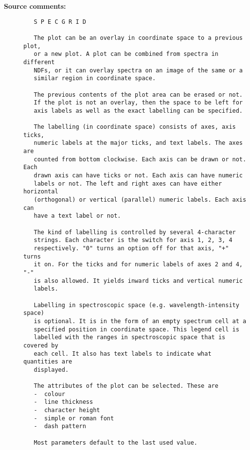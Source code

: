 \begin{description}
\item [{\bf Source comments:}]
\begin{verbatim}
   S P E C G R I D

   The plot can be an overlay in coordinate space to a previous plot,
   or a new plot. A plot can be combined from spectra in different
   NDFs, or it can overlay spectra on an image of the same or a
   similar region in coordinate space.

   The previous contents of the plot area can be erased or not.
   If the plot is not an overlay, then the space to be left for
   axis labels as well as the exact labelling can be specified.

   The labelling (in coordinate space) consists of axes, axis ticks,
   numeric labels at the major ticks, and text labels. The axes are
   counted from bottom clockwise. Each axis can be drawn or not. Each
   drawn axis can have ticks or not. Each axis can have numeric
   labels or not. The left and right axes can have either horizontal
   (orthogonal) or vertical (parallel) numeric labels. Each axis can
   have a text label or not.

   The kind of labelling is controlled by several 4-character
   strings. Each character is the switch for axis 1, 2, 3, 4
   respectively. "0" turns an option off for that axis, "+" turns
   it on. For the ticks and for numeric labels of axes 2 and 4, "-"
   is also allowed. It yields inward ticks and vertical numeric
   labels.

   Labelling in spectroscopic space (e.g. wavelength-intensity space)
   is optional. It is in the form of an empty spectrum cell at a
   specified position in coordinate space. This legend cell is
   labelled with the ranges in spectroscopic space that is covered by
   each cell. It also has text labels to indicate what quantities are
   displayed.

   The attributes of the plot can be selected. These are
   -  colour
   -  line thickness
   -  character height
   -  simple or roman font
   -  dash pattern

   Most parameters default to the last used value.
\end{verbatim}


\end{description}
